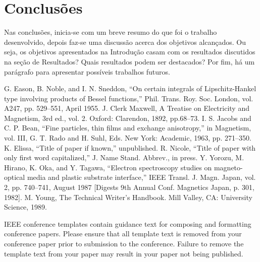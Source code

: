 \documentclass[conference]{IEEEtran}
\begin{document}
\section{Conclusões}

Nas conclusões, inicia-se com um breve resumo do que foi o trabalho desenvolvido,
depois faz-se uma discussão acerca dos objetivos alcançados. Ou seja, os objetivos
apresentados na Introdução casam com os resultados discutidos na seção de Resultados? 
Quais resultados podem ser destacados? Por fim, há um parágrafo para apresentar possíveis trabalhos futuros.

\begin{thebibliography}{00}
 G. Eason, B. Noble, and I. N. Sneddon, ``On certain integrals of Lipschitz-Hankel type involving products of Bessel functions,'' Phil. Trans. Roy. Soc. London, vol. A247, pp. 529--551, April 1955.
 J. Clerk Maxwell, A Treatise on Electricity and Magnetism, 3rd ed., vol. 2. Oxford: Clarendon, 1892, pp.68--73.
 I. S. Jacobs and C. P. Bean, ``Fine particles, thin films and exchange anisotropy,'' in Magnetism, vol. III, G. T. Rado and H. Suhl, Eds. New York: Academic, 1963, pp. 271--350.
 K. Elissa, ``Title of paper if known,'' unpublished.
 R. Nicole, ``Title of paper with only first word capitalized,'' J. Name Stand. Abbrev., in press.
 Y. Yorozu, M. Hirano, K. Oka, and Y. Tagawa, ``Electron spectroscopy studies on magneto-optical media and plastic substrate interface,'' IEEE Transl. J. Magn. Japan, vol. 2, pp. 740--741, August 1987 [Digests 9th Annual Conf. Magnetics Japan, p. 301, 1982].
 M. Young, The Technical Writer's Handbook. Mill Valley, CA: University Science, 1989.
\end{thebibliography}
\vspace{12pt}
\color{red}
IEEE conference templates contain guidance text for composing and formatting conference papers. Please ensure that all template text is removed from your conference paper prior to submission to the conference. Failure to remove the template text from your paper may result in your paper not being published.
\end{document}
